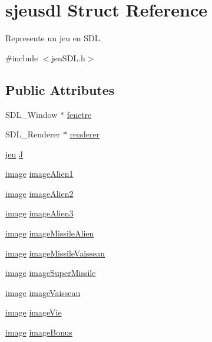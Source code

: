 \hypertarget{structsjeusdl}{}\section{sjeusdl Struct Reference}
\label{structsjeusdl}


Represente un jeu en S\+DL.  




{\ttfamily \#include $<$jeu\+S\+D\+L.\+h$>$}

\subsection*{Public Attributes}
\begin{DoxyCompactItemize}
\item 
S\+D\+L\+\_\+\+Window $\ast$ \hyperlink{structsjeusdl_add6855f14444a8af4bafb69710e191c2}{fenetre}
\item 
S\+D\+L\+\_\+\+Renderer $\ast$ \hyperlink{structsjeusdl_ace97cd01fc6707fd9bcf0430fd5869fa}{renderer}
\item 
\hyperlink{structsjeu}{jeu} \hyperlink{structsjeusdl_a3c824847fb4915d7636f57e3c1ff0d54}{J}
\item 
\hyperlink{structsimage}{image} \hyperlink{structsjeusdl_ac9d0afe4881465ffcf132833fdbdb7aa}{image\+Alien1}
\item 
\hyperlink{structsimage}{image} \hyperlink{structsjeusdl_acb390de49c7f64984691010a1d7d17bf}{image\+Alien2}
\item 
\hyperlink{structsimage}{image} \hyperlink{structsjeusdl_aaf39c6f8b27b928d90cc062d0251a133}{image\+Alien3}
\item 
\hyperlink{structsimage}{image} \hyperlink{structsjeusdl_ad73015b116a49ece7c301fca33ea49b1}{image\+Missile\+Alien}
\item 
\hyperlink{structsimage}{image} \hyperlink{structsjeusdl_a61937ce283d29bad48aa57249ea264e7}{image\+Missile\+Vaisseau}
\item 
\hyperlink{structsimage}{image} \hyperlink{structsjeusdl_aa6416df0136ba8798cc8db19f476de7a}{image\+Super\+Missile}
\item 
\hyperlink{structsimage}{image} \hyperlink{structsjeusdl_a3cf542984026079c3aba96a4e2c5329c}{image\+Vaisseau}
\item 
\hyperlink{structsimage}{image} \hyperlink{structsjeusdl_aab12033de9a989631b45a552ba538bd0}{image\+Vie}
\item 
\hyperlink{structsimage}{image} \hyperlink{structsjeusdl_a80c364b2a14ba9ab480645d7d7a11493}{image\+Bonus}

\end{DoxyCompactItemize}
